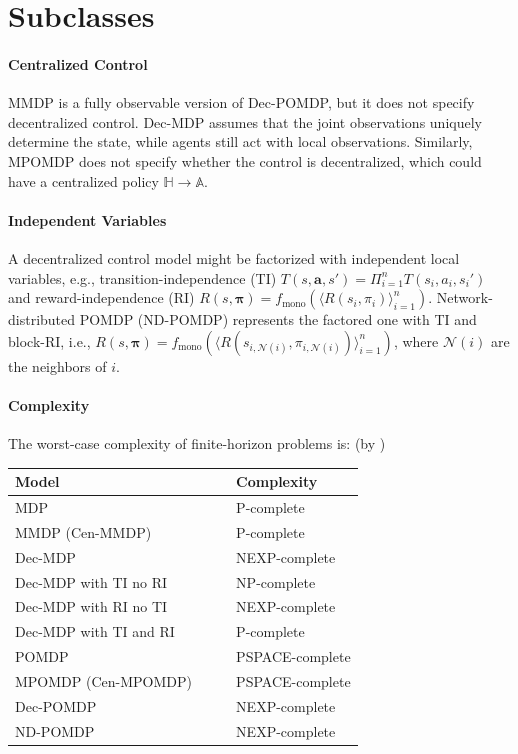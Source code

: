\documentclass{article} %
\begin{document}
\section{Subclasses}

\paragraph{Centralized Control}
MMDP is a fully observable version of Dec-POMDP, but it does not specify decentralized control. Dec-MDP assumes that the joint observations uniquely determine the state, while agents still act with local observations. Similarly, MPOMDP does not specify whether the control is decentralized, which could have a centralized policy $\mathbb{H}\to\mathbb{A}$.

\paragraph{Independent Variables}
A decentralized control model might be factorized with independent local variables, e.g., transition-independence (TI) $T(s, \boldsymbol{a}, s')=\Pi_{i=1}^{n} T(s_i, a_i, s_i')$ and reward-independence (RI) $R(s,\boldsymbol{\pi})=f_\text{mono}(\langle R(s_i, \pi_i)\rangle_{i=1}^{n})$. Network-distributed POMDP (ND-POMDP) represents the factored one with TI and block-RI, i.e., $R(s,\boldsymbol{\pi})=f_\text{mono}(\langle R(s_{i, \mathcal{N}(i)}, \pi_{i, \mathcal{N}(i)})\rangle_{i=1}^{n})$, where ${\mathcal{N}(i)}$ are the neighbors of $i$.

\paragraph{Complexity} The worst-case complexity of finite-horizon problems is: (by \cite{DecPOMDPsurvey})

\renewcommand{\arraystretch}{1.}
\vspace{-1mm}
\begin{table}[h!]
\centering
\begin{tabular}{lll}
\hline \hline
\textbf{Model} & \ \ & \textbf{Complexity} \\
\hline 
MDP & & P-complete \\
MMDP (Cen-MMDP) & & P-complete \\
Dec-MDP & & NEXP-complete \\
Dec-MDP with TI no RI & & NP-complete \\
Dec-MDP with RI no TI & & NEXP-complete \\
Dec-MDP with TI and RI & & P-complete \\
POMDP & & PSPACE-complete \\
MPOMDP (Cen-MPOMDP) & & PSPACE-complete \\
Dec-POMDP & & NEXP-complete \\
ND-POMDP & & NEXP-complete \\
\hline \hline
\end{tabular}\label{tab:complexity}
\end{table}
\end{document}
